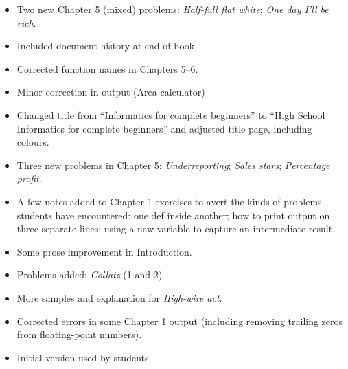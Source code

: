 {
\begin{itemize}
  \item Two new Chapter 5 (mixed) problems: \emph{Half-full flat white};
    \emph{One day I'll be rich}.
\end{itemize}

\begin{itemize}
  \item Included document history at end of book.
  \item Corrected function names in Chapters 5--6.
  \item Minor correction in output (Area calculator)
\end{itemize}

\begin{itemize}
  \item Changed title from ``Informatics for complete beginners'' to ``High School
    Informatics for complete beginners'' and adjusted title page, including colours.
  \item Three new problems in Chapter 5: \emph{Underreporting}; \emph{Sales stars};
    \emph{Percentage profit}.
\end{itemize}

\begin{itemize}
  \item A few notes added to Chapter 1 exercises to avert the kinds of problems students
    have encountered: one def inside another; how to print output on three separate lines;
    using a new variable to capture an intermediate result.
  \item Some prose improvement in Introduction.
  \item Problems added: \emph{Collatz} (1 and 2).
  \item More samples and explanation for \emph{High-wire act}.
  \item Corrected errors in some Chapter 1 output (including removing trailing zeros from
    floating-point numbers).
\end{itemize}

\begin{itemize}
  \item Initial version used by students.
\end{itemize}

}

